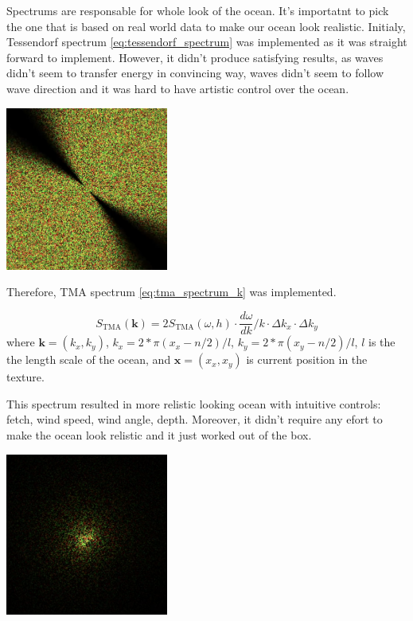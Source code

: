 Spectrums are responsable for whole look of the ocean. It's importatnt to pick the one that is based on real world data to make our ocean look realistic.
Initialy, Tessendorf spectrum \ref{eq:tessendorf_spectrum} was implemented as it was straight forward to implement. However, it didn't produce satisfying results, as waves didn't seem to transfer energy in convincing way, waves didn't seem to follow wave direction and it was hard to have artistic control over the ocean.

\begin{minipage}{1\textwidth}
    \centering
    \includegraphics[width=0.4\textwidth]{"images/phillips_spectrum.png"}
    \label{fig:phillips_spectrum}
\end{minipage}

Therefore, TMA spectrum \ref{eq:tma_spectrum_k} was implemented.

$$
    S_{\text{TMA}}(\mathbf{k}) = 2S_{\text{TMA}}(\omega, h) \cdot \frac{d\omega}{dk} / k \cdot \Delta k_x \cdot \Delta k_y
$$
where $\mathbf{k} = (k_x, k_y)$, $k_x = 2 * \pi (x_x - n/2)/ l$, $k_y = 2 * \pi (x_y - n/2)/ l$, $l$ is the the length scale of the ocean, 
and $\mathbf{x} = (x_x, x_y)$ is current position in the texture. 

This spectrum resulted in more relistic looking ocean with intuitive controls: fetch, wind speed, wind angle, depth. Moreover, it didn't require any efort to make the ocean look relistic and it just worked out of the box.
\begin{minipage}{1\textwidth}
    \centering
    \includegraphics[width=0.40\textwidth]{"images/tma_spectrum.png"}
    \label{fig:tma_spectrum}
\end{minipage}

